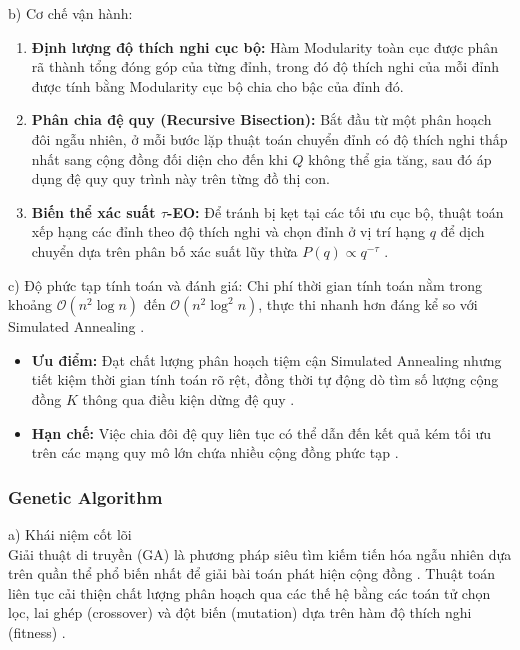 \documentclass[14pt,a4paper]{extarticle}
\begin{document}
\noindent b) Cơ chế vận hành:
\begin{enumerate}
    \item \textbf{Định lượng độ thích nghi cục bộ:} Hàm Modularity toàn cục được phân rã thành tổng đóng góp của từng đỉnh, trong đó độ thích nghi của mỗi đỉnh được tính bằng Modularity cục bộ chia cho bậc của đỉnh đó.
    \item \textbf{Phân chia đệ quy (Recursive Bisection):} Bắt đầu từ một phân hoạch đôi ngẫu nhiên, ở mỗi bước lặp thuật toán chuyển đỉnh có độ thích nghi thấp nhất sang cộng đồng đối diện cho đến khi $Q$ không thể gia tăng, sau đó áp dụng đệ quy quy trình này trên từng đồ thị con.
    \item \textbf{Biến thể xác suất $\tau$-EO:} Để tránh bị kẹt tại các tối ưu cục bộ, thuật toán xếp hạng các đỉnh theo độ thích nghi và chọn đỉnh ở vị trí hạng $q$ để dịch chuyển dựa trên phân bố xác suất lũy thừa $P(q) \propto q^{-\tau}$ \cite{Fortunato2010}.
\end{enumerate}

\noindent c) Độ phức tạp tính toán và đánh giá:
Chi phí thời gian tính toán nằm trong khoảng $\mathcal{O}(n^2 \log n)$ đến $\mathcal{O}(n^2 \log^2 n)$, thực thi nhanh hơn đáng kể so với Simulated Annealing \cite{Fortunato2010, Bedi2016}.
\begin{itemize}
    \item \textbf{Ưu điểm:} Đạt chất lượng phân hoạch tiệm cận Simulated Annealing nhưng tiết kiệm thời gian tính toán rõ rệt, đồng thời tự động dò tìm số lượng cộng đồng $K$ thông qua điều kiện dừng đệ quy \cite{Beldi2025}.
    \item \textbf{Hạn chế:} Việc chia đôi đệ quy liên tục có thể dẫn đến kết quả kém tối ưu trên các mạng quy mô lớn chứa nhiều cộng đồng phức tạp \cite{Fortunato2010}.
\end{itemize}

\subsubsection{Genetic Algorithm}

\noindent a) Khái niệm cốt lõi
\\ \indent
Giải thuật di truyền (GA) là phương pháp siêu tìm kiếm tiến hóa ngẫu nhiên dựa trên quần thể phổ biến nhất để giải bài toán phát hiện cộng đồng \cite{Chen2019, Beldi2025}. Thuật toán liên tục cải thiện chất lượng phân hoạch qua các thế hệ bằng các toán tử chọn lọc, lai ghép (crossover) và đột biến (mutation) dựa trên hàm độ thích nghi (fitness) \cite{Chen2019}.
\end{document}
